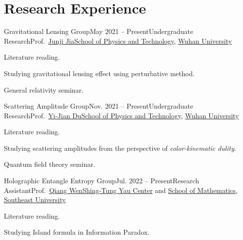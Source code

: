 \documentclass{resume}
\begin{document}
\section{Research Experience}
\begin{content}

    \begin{position}{Gravitational Lensing Group}{May 2021 -- Present}{Undergraduate Research}{Prof.~\href{https://physics.whu.edu.cn/info/1053/2152.htm}{Junji Jia}}{\href{https://physics.whu.edu.cn}{School of Physics and Technology}, \href{https://www.whu.edu.cn}{Wuhan University}}
        \item Literature reading.
        \item Studying gravitational lensing effect using perturbative method.
        \item General relativity seminar.
    \end{position}
    \vspace{-.5\baselineskip}

    \begin{position}{Scattering Amplitude Group}{Nov. 2021 -- Present}{Undergraduate Research}{Prof.~\href{https://physics.whu.edu.cn/info/1053/2130.htm}{Yi-Jian Du}}{\href{https://physics.whu.edu.cn}{School of Physics and Technology}, \href{https://www.whu.edu.cn}{Wuhan University}}
        \item Literature reading.
        \item Studying scattering amplitudes from the perspective of \textit{color-kinematic dulity}.
        \item Quantum field theory seminar.
    \end{position}
    \vspace{-.5\baselineskip}

    \begin{position}{Holographic Entangle Entropy Group}{Jul. 2022 -- Present}{Research Assistant}{Prof.~\href{https://yauc.seu.edu.cn/wq1_33668_en/list.htm}{Qiang Wen}}{\href{https://yauc.seu.edu.cn/}{Shing-Tung Yau Center} and \href{https://math.seu.edu.cn/}{School of Mathematics}, \href{https://www.seu.edu.cn/}{Southeast University}}
        \item Literature reading.
        \item Studying Island formula in Information Paradox.
    \end{position}
    \vspace{-.5\baselineskip}
    \sectionlineskip
\end{content}
\end{document}
